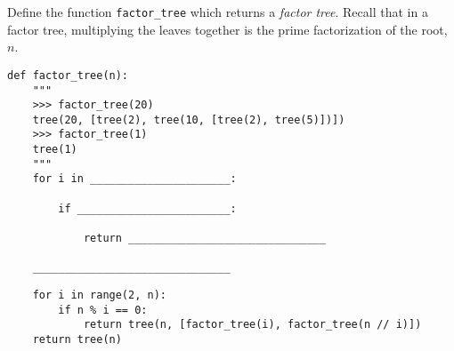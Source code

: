 \begin{blocksection}
\question Define the function \lstinline$factor_tree$ which returns a \emph{factor tree}. Recall that in a factor tree, multiplying the leaves together is the prime factorization of the root, $n$. \\

\begin{lstlisting}
def factor_tree(n):
    """
    >>> factor_tree(20)
    tree(20, [tree(2), tree(10, [tree(2), tree(5)])])
    >>> factor_tree(1)
    tree(1)
    """
    for i in ______________________:

        if ________________________:

            return _______________________________

    _______________________________
\end{lstlisting}

\begin{solution}[0.5in]
\begin{lstlisting}
    for i in range(2, n):
        if n % i == 0:
            return tree(n, [factor_tree(i), factor_tree(n // i)])
    return tree(n)
\end{lstlisting}
\end{solution}
\end{blocksection}
